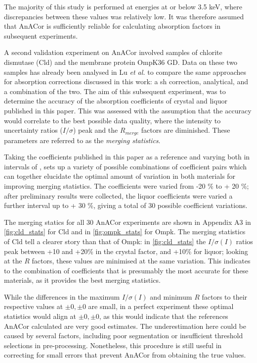 The majority of this study is performed at energies at or below 3.5 \unit{keV}, where discrepancies between these values was relatively low. It was therefore assumed that AnACor is sufficiently reliable for calculating absorption factors in subsequent experiments.%

A second validation experiment on AnACor involved samples of chlorite dismutase (Cld) and the membrane protein OmpK36 GD. Data on these two samples has already been analysed in Lu \textit{et al.} \cite{Lu2024} to compare the same approaches for absorption corrections discussed in this work: a \ac{sh} correction, analytical, and a combination of the two. The aim of this subsequent experiment, was to determine the accuracy of the absorption coefficients of crystal and liquor published in this paper. This was assessed with the assumption that the accuracy would correlate to the best possible data quality, where the intensity to uncertainty ratios ($I / \sigma$) peak and the $R_{merge}$ factors are diminished. These parameters are referred to as the \textit{merging statistics}.

Taking the coefficients published in this paper as a reference and varying both in intervals of , sets up a variety of possible combinations of coefficient pairs which can together elucidate the optimal amount of variation in both materials for improving merging statistics. The coefficients were varied from -20 \% to + 20 \%; after preliminary results were collected, the liquor coefficients were varied a further interval up to + 30 \%, giving a total of 30 possible coefficient variations. %

The merging statics for all 30 AnACor experiments are shown in Appendix A3 in \cref{fig:cld_stats} for Cld and in \cref{fig:ompk_stats} for Ompk. The merging statistics of Cld tell a clearer story than that of Ompk: in \cref{fig:cld_stats} the $I/\sigma(I)$ ratios peak between +10 and +20\% in the crystal factor, and +10\% for liquor; looking at the $R$ factors, these values are minimised at the same variation. This indicates to the combination of coefficients that is presumably the most accurate for these materials, as it provides the best merging statistics.

While the differences in the maximum $I/\sigma(I)$ and minimum $R$ factors to their respective values at $\pm0,\pm0$ are small, in a perfect experiment these optimal statistics would align at $\pm0,\pm0$, as this would indicate that the references AnACor calculated are very good estimates. The underestimation here could be caused by several factors, including poor segmentation or insufficient threshold selections in pre-processing. Nonetheless, this procedure is still useful in correcting for small errors that prevent %
AnACor from obtaining the true values. 

